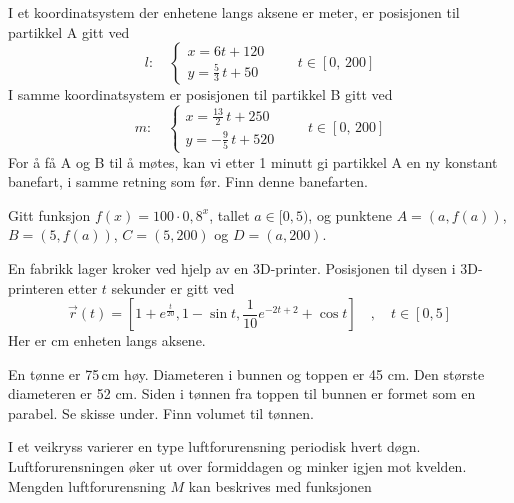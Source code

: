 I et koordinatsystem der enhetene langs aksene er meter, er posisjonen til partikkel A gitt ved
\[
l:\quad
\begin{cases}
	x = 6t + 120 \\[4pt]
	y = \frac{5}{3}\,t + 50
\end{cases}
\qquad t \in [0,\, 200]
\]
I samme koordinatsystem er posisjonen til partikkel B gitt ved
\[
m:\quad
\begin{cases}
	x = \frac{13}{2}\,t + 250 \\[4pt]
	y = -\frac{9}{5}\,t + 520
\end{cases}
\qquad t \in [0,\, 200]
\]
For å få A og B til å møtes, kan vi etter 1 minutt gi partikkel A en ny konstant banefart, i samme retning som før. Finn denne banefarten.

Gitt funksjon $f(x) = 100 \cdot 0,8^x$, tallet $a\in[0,5)$, og punktene $A=(a, f(a))$, $B=(5, f(a))$, $C=(5, 200)$ og $D=(a, 200)$.

En fabrikk lager kroker ved hjelp av en 3D-printer. Posisjonen til dysen i 3D-printeren etter $t$ sekunder er gitt ved
\[
\vec{r}(t) = \left[1 + e^{\frac{t}{20}}, 1 - \sin t, \frac{1}{10} e^{-2t+2} + \cos t \right]\quad, \quad t \in [0, 5]
\]
Her er cm enheten langs aksene.

En tønne er 75\,cm høy. Diameteren i bunnen og toppen er 45 cm.
Den største diameteren er 52 cm.
Siden i tønnen fra toppen til bunnen er formet som en parabel. Se skisse under.
Finn volumet til tønnen.


I et veikryss varierer en type luftforurensning periodisk hvert døgn.
Luftforurensningen øker ut over formiddagen og minker igjen mot kvelden.
Mengden luftforurensning $M$ kan beskrives med funksjonen

